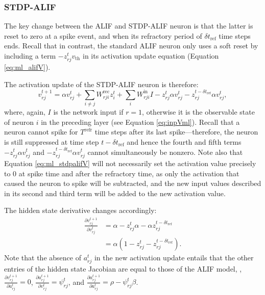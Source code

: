 		\subsubsection{STDP-ALIF}
			The key change between the ALIF and STDP-ALIF neuron is that the latter is reset to zero at a spike event, and when its refractory period of $\delta t_\text{ref}$ time steps ends.
			Recall that in contrast, the standard ALIF neuron only uses a soft reset by including a term $-z^t_{rj}v_\text{th}$ in its activation update equation (Equation \ref{eq:ml_alifV}).

			The activation update of the STDP-ALIF neuron is therefore:
			\begin{equation}\label{eq:ml_stdpalifV}
	        v^{t+1}_{rj} = \alpha v_{rj}^t + \sum_{i\neq j}W^\text{rec}_{rji}z_i^t + \sum_i W^\text{in}_{rji}I -z^t_{rj}\alpha v^t_{rj} - z_{rj}^{t-\delta t_\text{ref}}\alpha v^t_{rj},
	        \end{equation}
	        where, again, $I$ is the network input if $r=1$, otherwise it is the observable state of neuron $i$ in the preceding layer (see Equation \ref{eq:inpVml}).
	        Recall that a neuron cannot spike for $T^\text{refr}$ time steps after its last spike---therefore, the neuron is still suppressed at time step $t-\delta t_\text{ref}$ and hence the fourth and fifth terms $-z^t_{rj}\alpha v^t_{rj}$ and $- z_{rj}^{t-\delta t_\text{ref}}\alpha v^t_{rj}$ cannot simultaneously be nonzero.
	        Note also that Equation \ref{eq:ml_stdpalifV} will not necessarily set the activation value precisely to 0 at spike time and after the refractory time, as only the activation that caused the neuron to spike will be subtracted, and the new input values described in its second and third term will be added to the new activation value.

	        The hidden state derivative changes accordingly:
	        \begin{align}
	        \frac{\partial v_{rj}^{t+1}}{\partial v^t_{rj}} &= \alpha - z^t_{rj}\alpha - \alpha z_{rj}^{t-\delta t_\text{ref}}\\
	        &= \alpha\left(1 - z^t_{rj} - z_{rj}^{t-\delta t_\text{ref}}\right).
	        \end{align}
	        Note that the absence of $a^t_{rj}$ in the new activation update entails that the other entries of the hidden state Jacobian are equal to those of the ALIF model, \ie, $\frac{\partial v^{t+1}_{rj}}{\partial a^t_{rj}}=0$, $\frac{\partial a^{t+1}_{rj}}{\partial v^t_{rj}}=\psi^t_{rj}$, and $\frac{\partial a^{t+1}_{rj}}{\partial a^t_{rj}} = \rho - \psi^t_{rj}\beta$.


